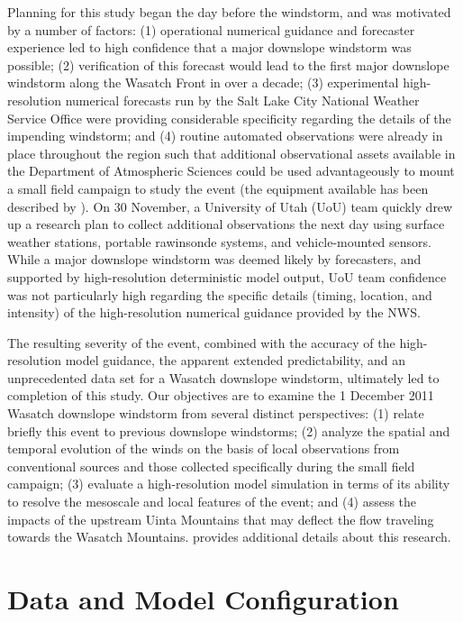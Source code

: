 \documentclass[pdftex,12pt]{article}
\begin{document}
Planning for this study began the day before the windstorm, and was motivated by a number of factors: (1) operational numerical guidance and forecaster experience led to high confidence that a major downslope windstorm was possible; (2) verification of this forecast would lead to the first major downslope windstorm along the Wasatch Front in over a decade; (3) experimental high-resolution numerical forecasts run by the Salt Lake City National Weather Service Office were providing considerable specificity regarding the details of the impending windstorm; and (4) routine automated observations were already in place throughout the region such that additional observational assets available in the Department of Atmospheric Sciences could be used advantageously to mount a small field campaign to study the event (the equipment available has been described by \citealt{Lareau2013}). On 30 November, a University of Utah (UoU) team quickly drew up a research plan to collect additional observations the next day using surface weather stations, portable rawinsonde systems, and vehicle-mounted sensors. While a major downslope windstorm was deemed likely by forecasters, and supported by high-resolution deterministic model output, UoU team confidence was not particularly high regarding the specific details (timing, location, and intensity) of the high-resolution numerical guidance provided by the NWS.  

The resulting severity of the event, combined with the accuracy of the high-resolution model guidance, the apparent extended predictability, and an unprecedented data set for a Wasatch downslope windstorm, ultimately led to completion of this study. Our objectives are to examine the 1 December 2011 Wasatch downslope windstorm from several distinct perspectives: (1) relate briefly this event to previous downslope windstorms; (2) analyze the spatial and temporal evolution of the winds on the basis of local observations from conventional sources and those collected specifically during the small field campaign; (3) evaluate a high-resolution model simulation in terms of its ability to resolve the mesoscale and local features of the event; and (4) assess the impacts of the upstream Uinta Mountains that may deflect the flow traveling towards the Wasatch Mountains. \citet{Lawson2013a} provides additional details about this research.

\section{Data and Model Configuration}
\end{document}
